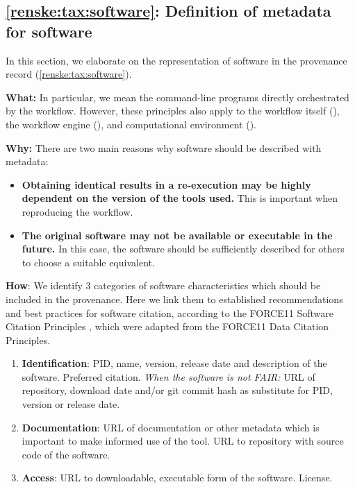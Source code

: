\subsection{\ref{renske:tax:software}: Definition of metadata for software}
\label{renske:sec:software_reqs}

In this section, we elaborate on the representation of software in the provenance record (\ref{renske:tax:software}). 

\textbf{What:} In particular, we mean the command-line programs directly orchestrated by the workflow. However, these principles also apply to the workflow itself (), the workflow engine (), and computational environment ().

\textbf{Why:} There are two main reasons why software should be described with metadata:

\begin{itemize}
    \item \textbf{Obtaining identical results in a re-execution may be highly dependent on the version of the tools used.} This is important when reproducing the workflow. 
    \item \textbf{The original software may not be available or executable in the future.} In this case, the software should be sufficiently described for others to choose a suitable equivalent. 
\end{itemize}

\textbf{How}: We identify 3 categories of software characteristics which should be included in the provenance. Here we link them to established recommendations and best practices for software citation, according to the FORCE11 Software Citation Principles \cite{smithSoftwareCitationPrinciples2016}, which were adapted from the FORCE11 Data Citation Principles.

\begin{enumerate}[label=\textbf{SW\arabic*}]
    \item \textbf{Identification}: PID, name, version, release date and description of the software. Preferred citation. \textit{When the software is not FAIR:} URL of repository, download date and/or git commit hash as substitute for PID, version or release date. \label{renske:req:sw_id}
    \item \textbf{Documentation}: URL of documentation or other metadata which is important to make informed use of the tool. URL to repository with source code of the software. \label{renske:req:sw_doc}
    \item \textbf{Access}: URL to downloadable, executable form of the software. License. \label{renske:req:sw_access}
\end{enumerate}
